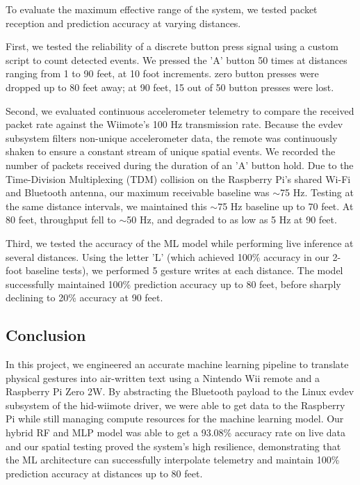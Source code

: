 \documentclass[letterpaper,twocolumn,10pt]{article}
\begin{document}
To evaluate the maximum effective range of the system, we tested packet reception and prediction accuracy at varying distances. 

First, we tested the reliability of a discrete button press signal using a custom script to count detected events. We pressed the 'A' button 50 times at distances ranging from 1 to 90 feet, at 10 foot increments. zero button presses were dropped up to 80 feet away; at 90 feet, 15 out of 50 button presses were lost.

Second, we evaluated continuous accelerometer telemetry to compare the received packet rate against the Wiimote’s 100 Hz transmission rate. Because the evdev subsystem filters non-unique accelerometer data, the remote was continuously shaken to ensure a constant stream of unique spatial events. We recorded the number of packets received during the duration of an 'A' button hold. Due to the Time-Division Multiplexing (TDM) collision on the Raspberry Pi’s shared Wi-Fi and Bluetooth antenna, our maximum receivable baseline was $\sim$75 Hz. Testing at the same distance intervals, we maintained this $\sim$75 Hz baseline up to 70 feet. At 80 feet, throughput fell to $\sim$50 Hz, and degraded to as low as 5 Hz at 90 feet. 

Third, we tested the accuracy of the ML model while performing live inference at several distances. Using the letter 'L' (which achieved 100\% accuracy in our 2-foot baseline tests), we performed 5 gesture writes at each distance. The model successfully maintained 100\% prediction accuracy up to 80 feet, before sharply declining to 20\% accuracy at 90 feet.  

\subsection*{Conclusion}
In this project, we engineered an accurate machine learning pipeline to translate physical gestures into air-written text using a Nintendo Wii remote and a Raspberry Pi Zero 2W. By abstracting the Bluetooth payload to the Linux evdev subsystem of the hid-wiimote driver, we were able to get data to the Raspberry Pi while still managing compute resources for the machine learning model. Our hybrid RF and MLP model was able to get a 93.08\% accuracy rate on live data and our spatial testing proved the system's high resilience, demonstrating that the ML architecture can successfully interpolate telemetry and maintain 100\% prediction accuracy at distances up to 80 feet.
\end{document}
